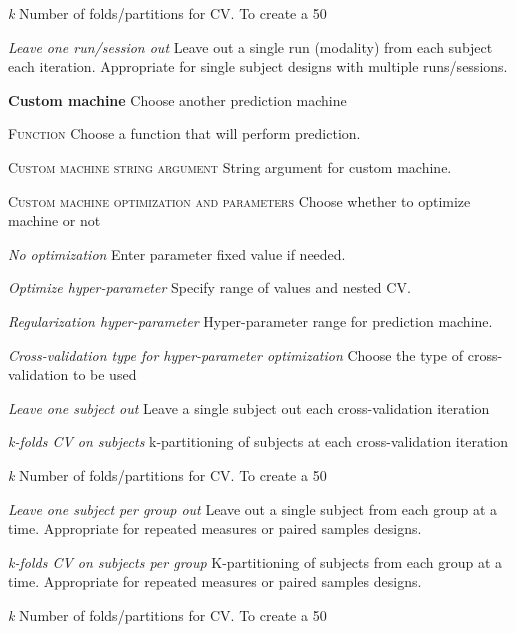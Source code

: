 \textit{k}
Number of folds/partitions for CV. To create a 50%


\textit{Leave one run/session out}
Leave out a single run (modality) from each subject each iteration. Appropriate for single subject designs with multiple runs/sessions.


\textbf{Custom machine}
Choose another prediction machine


\textsc{Function}
Choose a function that will perform prediction.


\textsc{Custom machine string argument}
String argument for custom machine.


\textsc{Custom machine optimization and parameters}
Choose whether to optimize machine or not


\textsl{No optimization}
Enter parameter fixed value if needed.


\textsl{Optimize hyper-parameter}
Specify range of values and nested CV.


\textit{Regularization hyper-parameter}
Hyper-parameter range for prediction machine.


\textit{Cross-validation type for hyper-parameter optimization}
Choose the type of cross-validation to be used


\textit{Leave one subject out}
Leave a single subject out each cross-validation iteration


\textit{k-folds CV on subjects}
k-partitioning of subjects at each cross-validation iteration


\textit{k}
Number of folds/partitions for CV. To create a 50%


\textit{Leave one subject per group out}
Leave out a single subject from each group at a time. Appropriate for repeated measures or paired samples designs.


\textit{k-folds CV on subjects per group}
K-partitioning of subjects from each group at a time. Appropriate for repeated measures or paired samples designs.


\textit{k}
Number of folds/partitions for CV. To create a 50%



